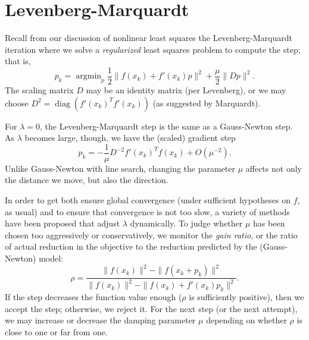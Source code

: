 \documentclass[12pt, leqno]{article} %
\begin{document}

\section{Levenberg-Marquardt}

Recall from our discussion of nonlinear least squares the
Levenberg-Marquardt iteration where we solve a \emph{regularized} least
squares problem to compute the step; that is,
\[p_k = \operatorname{argmin}_p
    \frac{1}{2} \|f(x_k) + f'(x_k) p\|^2 +
    \frac{\mu}{2} \|Dp\|^2.\] The scaling matrix \(D\) may be an
identity matrix (per Levenberg), or we may choose
\(D^2 = \operatorname{diag}(f'(x_k)^T f'(x_k))\) (as suggested by
Marquardt).

For \(\lambda = 0\), the Levenberg-Marquardt step is the same as a
Gauss-Newton step. As \(\lambda\) becomes large, though, we have the
(scaled) gradient step
\[p_k = -\frac{1}{\mu} D^{-2} f'(x_k)^T f(x_k) + O(\mu^{-2}).\] Unlike
Gauss-Newton with line search, changing the parameter \(\mu\) affects
not only the distance we move, but also the direction.

In order to get both ensure global convergence (under sufficient
hypotheses on \(f\), as usual) and to ensure that convergence is not too
slow, a variety of methods have been proposed that adjust \(\lambda\)
dynamically. To judge whether \(\mu\) has been chosen too aggressively
or conservatively, we monitor the \emph{gain ratio}, or the ratio of
actual reduction in the objective to the reduction predicted by the
(Gauss-Newton) model: \[\rho =
  \frac{\|f(x_k)\|^2-\|f(x_k+p_k)\|^2}
       {\|f(x_k)\|^2 - \|f(x_k)+f'(x_k)p_k\|^2}.\] If the step decreases
the function value enough (\(\rho\) is sufficiently positive), then we
accept the step; otherwise, we reject it. For the next step (or the next
attempt), we may increase or decrease the damping parameter \(\mu\)
depending on whether \(\rho\) is close to one or far from one.
\end{document}
